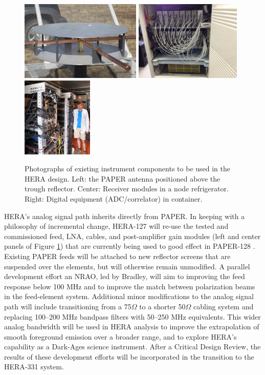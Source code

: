 \documentclass[preprint]{aastex}
\begin{document}
\begin{figure}[h]
    \centering
        \includegraphics[height=1.5in]{plots/new_antenna_closeup.jpg}
        \includegraphics[height=1.5in]{plots/Engineering/recv_node.png}
        \includegraphics[height=1.5in]{plots/Engineering/digital.png}
    \caption{\small
    Photographs of existing instrument components to be used in the HERA design.
    Left: the PAPER antenna positioned above the trough reflector.
    Center: Receiver modules in a node refrigerator.
    Right: Digital equipment (ADC/correlator) in container.}\label{fig:components}
\end{figure}

HERA's analog signal path inherits directly from PAPER.
In keeping with a philosophy of
incremental change,
HERA-127 will re-use the tested and commissioned feed, LNA, cables, and post-amplifier gain modules
(left and center panels of Figure \ref{fig:components}) that are currently being
used to good effect in PAPER-128 \citep{parsons_et_al2010}.  Existing PAPER feeds will be attached to new
reflector screens that are suspended over the elements, but will otherwise remain unmodified.
A parallel development effort an NRAO, led by Bradley, will aim to improving the feed response below
100 MHz 
and to improve the match between polarization beams in the feed-element system.  
Additional
minor modifications to the analog signal path will include transitioning from a 75$\Omega$ to a
shorter 50$\Omega$ cabling system and replacing 100--200 MHz bandpass filters with 50--250 MHz equivalents.
This wider analog bandwidth will be used in HERA analysis to improve the extrapolation of smooth foreground
emission over a broader range, and to explore HERA's capability as a Dark-Ages science instrument.
After a Critical Design Review, the results of these development efforts will be incorporated in
the transition to the HERA-331 system.  
\end{document}
